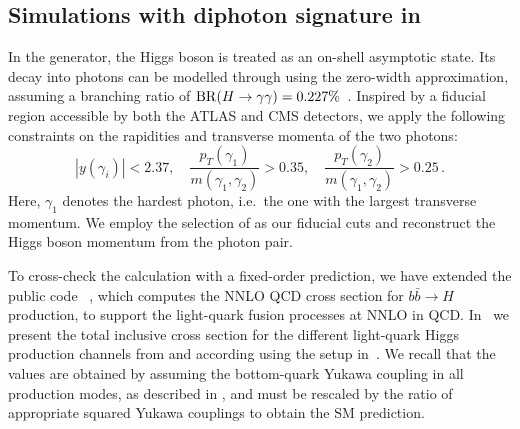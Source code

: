 \documentclass[11pt,a4paper]{article}
\begin{document}
\subsection{Simulations with diphoton signature in \minnlo{}}

In the \minnlo{} generator, the Higgs boson is treated as an on-shell asymptotic state. 
Its decay into photons can be modelled through  using the 
zero-width approximation, assuming a branching ratio of
 ${\rm BR}(H \to \gamma\gamma) = 0.227\%$~\cite{LHCHiggsCrossSectionWorkingGroup:2016ypw}.
Inspired by a fiducial region accessible by both the ATLAS and CMS detectors, we apply the following constraints on the rapidities and transverse momenta of the two photons:
\begin{equation}
|y(\gamma_i)|< 2.37, \quad
\frac{p_T(\gamma_1)}{m(\gamma_1, \gamma_2)} > 0.35,\quad \frac{p_T(\gamma_2)}{m(\gamma_1, \gamma_2)} > 0.25\,. \label{eq:aafidmycuts}
\end{equation}
Here, $ \gamma_1 $ denotes the hardest photon, i.e.\ the one with the largest transverse momentum. We employ the selection of  as our fiducial cuts 
and reconstruct the Higgs boson momentum from the photon pair.

To cross-check the \minnlo{} calculation with a fixed-order prediction, we have extended the public code \SuSHi{}~\cite{Harlander:2012pb,Harlander:2003ai},
which computes the NNLO QCD cross section for  $b\bar b\to H$ production,
to support the light-quark fusion processes at NNLO in QCD. 
In~ we present the total inclusive cross section for
the different light-quark Higgs production channels from 
\SuSHi{} and \minnlo{} according using the setup in~. 
We recall that the values are obtained by assuming 
the bottom-quark Yukawa coupling in all production modes, 
as described in , and must be rescaled by the ratio of appropriate 
squared Yukawa couplings to obtain the SM prediction. 
\end{document}
